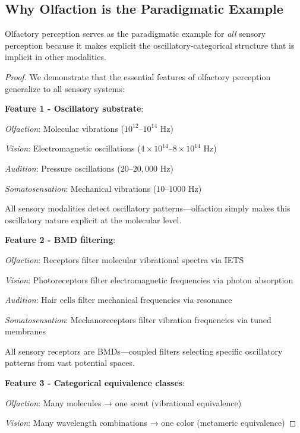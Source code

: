 \subsection{Why Olfaction is the Paradigmatic Example}

\begin{theorem}
\label{thm:olfaction_paradigm}
Olfactory perception serves as the paradigmatic example for \textit{all} sensory perception because it makes explicit the oscillatory-categorical structure that is implicit in other modalities.
\end{theorem}

\begin{proof}
We demonstrate that the essential features of olfactory perception generalize to all sensory systems:

\textbf{Feature 1 - Oscillatory substrate}:

\textit{Olfaction}: Molecular vibrations ($10^{12}$--$10^{14}$ Hz)

\textit{Vision}: Electromagnetic oscillations ($4 \times 10^{14}$--$8 \times 10^{14}$ Hz)

\textit{Audition}: Pressure oscillations ($20$--$20,000$ Hz)

\textit{Somatosensation}: Mechanical vibrations ($10$--$1000$ Hz)

All sensory modalities detect oscillatory patterns—olfaction simply makes this oscillatory nature explicit at the molecular level.

\textbf{Feature 2 - BMD filtering}:

\textit{Olfaction}: Receptors filter molecular vibrational spectra via IETS

\textit{Vision}: Photoreceptors filter electromagnetic frequencies via photon absorption

\textit{Audition}: Hair cells filter mechanical frequencies via resonance

\textit{Somatosensation}: Mechanoreceptors filter vibration frequencies via tuned membranes

All sensory receptors are BMDs—coupled filters selecting specific oscillatory patterns from vast potential spaces.

\textbf{Feature 3 - Categorical equivalence classes}:

\textit{Olfaction}: Many molecules → one scent (vibrational equivalence)

\textit{Vision}: Many wavelength combinations → one color (metameric equivalence)


\end{proof}

